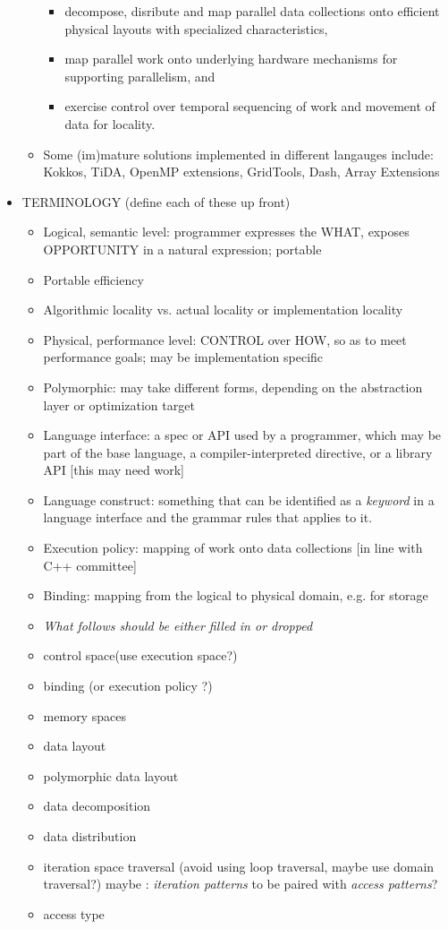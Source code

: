 \begin{itemize}
\begin{itemize}
    \begin{itemize}
    \item decompose, disribute and map parallel data collections onto efficient physical layouts with specialized characteristics, 
    \item map parallel work onto underlying hardware mechanisms for supporting parallelism, and 
    \item exercise control over temporal sequencing of work and movement of data for locality.
    \end{itemize}
  \item Some (im)mature solutions implemented in different langauges include: Kokkos, TiDA, OpenMP extensions, GridTools, Dash, Array Extensions
\end{itemize}


\item TERMINOLOGY (define each of these up front)
  \begin{itemize}
  \item Logical, semantic level: programmer expresses the WHAT, exposes OPPORTUNITY in a natural expression; portable
  \item Portable efficiency
  \item Algorithmic locality vs. actual locality or implementation locality
  \item Physical, performance level: CONTROL over HOW, so as to meet performance goals; may be implementation specific
  \item Polymorphic: may take different forms, depending on the abstraction layer or optimization target
  \item Language interface: a spec or API used by a programmer, which may be part of the base language, a compiler-interpreted directive, or a library API [this may need work] 
  \item Language construct: something that can be identified as a {\em keyword} in a language interface and the grammar rules that applies to it.
  \item Execution policy: mapping of work onto data collections [in line with C++ committee]
  \item Binding: mapping from the logical to physical domain, e.g. for storage
  \item {\em What follows should be either filled in or dropped}
  \item control space(use execution space?)
  \item binding  (or execution policy ?)
  \item memory spaces
  \item data layout
  \item polymorphic data layout
  \item data decomposition 
  \item data distribution 
  \item iteration space traversal (avoid using loop traversal, maybe use domain traversal?) maybe : {\em iteration patterns} to be paired with {\em access patterns}?
  \item access type
  \end{itemize}



\end{itemize}
